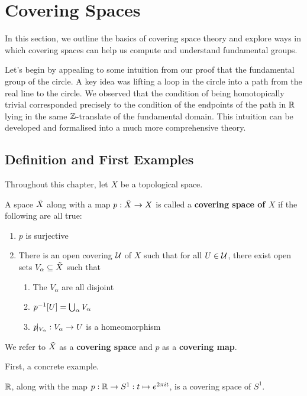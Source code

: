 \section{Covering Spaces}

In this section, we outline the basics of covering space theory and explore ways in which covering spaces can help us compute and understand fundamental groups.

Let's begin by appealing to some intuition from our proof that the fundamental group of the circle. A key idea was lifting a loop in the circle into a path from the real line to the circle. We observed that the condition of being homotopically trivial corresponded precisely to the condition of the endpoints of the path in $\R$ lying in the same $\mathbb{Z}$-translate of the fundamental domain. This intuition can be developed and formalised into a much more comprehensive theory.

\subsection{Definition and First Examples}

Throughout this chapter, let $X$ be a topological space.

\begin{boxdefinition}
    A space $\Tilde{X}$ along with a map $p : \Tilde{X} \to X$ is called a \textbf{covering space of $X$} if the following are all true:
    \begin{enumerate}
        \item $p$ is surjective
        \item There is an open covering $\mathcal{U}$ of $X$ such that for all $U \in \mathcal{U}$, there exist open sets $V_{\alpha} \subseteq \Tilde{X}$ such that
        \begin{enumerate}
            \item The $V_{\alpha}$ are all disjoint
            \item $p^{-1}[U] = \bigcup_{\alpha} V_{\alpha}$
            \item $p\!\vert_{V_{\alpha}} : V_{\alpha} \to U$ is a homeomorphism
        \end{enumerate}
    \end{enumerate}
    We refer to $\Tilde{X}$ as a \textbf{covering space} and $p$ as a \textbf{covering map}.
\end{boxdefinition}

First, a concrete example.

\begin{boxexample}[$\R$ covers $S^1$]
    $\R$, along with the map $p : \mathbb{R} \to S^1 : t \mapsto e^{2\pi i t}$, is a covering space of $S^1$.
\end{boxexample}

